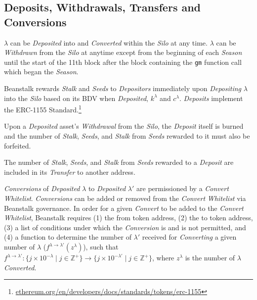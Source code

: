\documentclass[tikz]{article}
\newcommand{\code}[1]{\texttt{#1}}
\newcommand{\term}[1]{\textsl{#1}}
\newcommand{\fref}[1]{\footnote{\href{http://#1}{#1}}}
\begin{document}

\vspace*{-1mm}
\subsection{Deposits, Withdrawals, Transfers and Conversions}
\vspace*{-1mm}

\hyperlink{ht126}{$\lambda$} can be \term{Deposited} into and \term{Converted} within the \term{Silo} at any time. {$\lambda$} can be \term{Withdrawn} from the \term{Silo} at anytime except from the beginning of each \term{Season} until the start of the 11th block after the block containing the \code{gm} function call which began the \term{Season}. 

\vspace*{-1mm}

\newpage
Beanstalk rewards \term{Stalk} and \term{Seeds} to \term{Depositors} immediately upon \term{Depositing} \hyperlink{ht126}{$\lambda$} into the \term{Silo} based on its BDV when \term{Deposited}, \hyperlink{ht120}{$k^{\lambda}$} and \hyperlink{ht32}{$c^{\lambda}$}. \term{Deposits} implement the ERC-1155 Standard.\fref{ethereum.org/en/developers/docs/standards/tokens/erc-1155}

Upon a \term{Deposited} asset's \term{Withdrawal} from the \term{Silo}, the \term{Deposit} itself is burned and the number of \term{Stalk}, \term{Seeds}, and \term{Stalk} from \term{Seeds} rewarded to it must also be forfeited. 

The number of \term{Stalk}, \term{Seeds}, and \term{Stalk} from \term{Seeds} rewarded to a \term{Deposit} are included in its \term{Transfer} to another address.

\term{Conversions} of \term{Deposited} \hyperlink{ht126}{$\lambda$} to \term{Deposited} $\lambda'$ are permissioned by a \term{Convert} \term{Whitelist}. \term{Conversions} can be added or removed from the \term{Convert} \term{Whitelist} via Beanstalk governance. In order for a given \term{Convert} to be added to the \term{Convert} \term{Whitelist}, Beanstalk requires (1) the from token address, (2) the to token address, (3) a list of conditions under which the \term{Conversion} is and is not permitted, and (4) a function to determine the number of $\lambda'$ received for \term{Converting} a given number of \hyperlink{ht126}{$\lambda$} ($f^{\lambda \rightarrow \lambda'}(z^{\lambda})$), such that $f^{\lambda \rightarrow \lambda'}\colon \{j \times 10^{-\lambda} \mid j \in \mathbb{Z}^{+} \} \rightarrow \{j \times 10^{-\lambda'} \mid j \in \mathbb{Z}^{+} \}$, where $z^{\lambda}$ is the number of \hyperlink{ht126}{\hyperlink{ht126}{$\lambda$}} \term{Converted}. 
\end{document}
